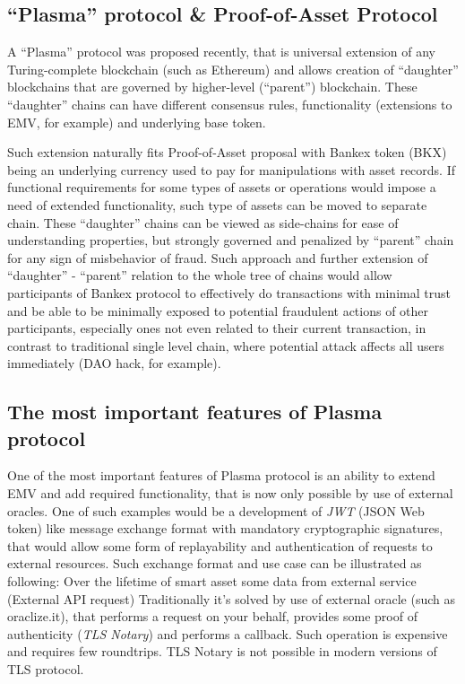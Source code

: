 \documentclass{article}
\begin{document}
\begin{multicols}{2}
\subsection{\enquote{Plasma} protocol \& Proof-of-Asset Protocol}

A \enquote{Plasma} protocol was proposed recently, that is universal extension of any Turing-complete blockchain (such as Ethereum)  and allows creation of \enquote{daughter} blockchains that are governed by higher-level (\enquote{parent}) blockchain. These \enquote{daughter} chains can have different consensus rules, functionality (extensions to EMV, for example) and underlying base token. 

Such extension naturally fits Proof-of-Asset proposal with Bankex token (BKX) being an underlying currency used to pay for manipulations with asset records. If functional requirements for some types of assets or operations would impose a need of extended functionality, such type of assets can be moved to separate chain. These \enquote{daughter} chains can be viewed as side-chains for ease of understanding properties, but strongly governed and penalized by \enquote{parent} chain for any sign of misbehavior of fraud. Such approach and further extension of \enquote{daughter} - \enquote{parent} relation to the whole tree of chains would allow participants of Bankex protocol to effectively do transactions with minimal trust and be able to be minimally exposed to potential fraudulent actions of other participants, especially ones not even related to their current transaction, in contrast to traditional single level chain, where potential attack affects all users immediately (DAO hack, for example). 

\subsection{The most important features of Plasma protocol}

One of the most important features of Plasma protocol is an ability to extend EMV and add required functionality, that is now only possible by use of external oracles. One of such examples would be a development of \textit{JWT} (JSON Web token) like message exchange format with mandatory cryptographic signatures, that would allow some form of replayability and authentication of requests to external resources. Such exchange format and use case can be illustrated as following:
Over the lifetime of smart asset some data from external service (External API request)
Traditionally it’s solved by use of external oracle (such as oraclize.it), that performs a request on your behalf, provides some proof of authenticity (\textit{TLS Notary}) and performs a callback.
Such operation is expensive and requires few roundtrips. TLS Notary is not possible in modern versions of TLS protocol.


\end{multicols}
\end{document}
